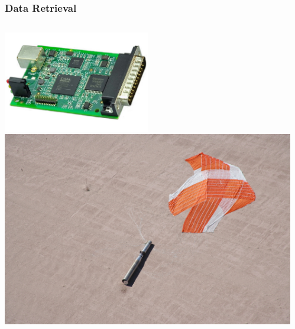 \documentclass[landscape,xcolor={table}]{beamer}
\begin{document}
	\begin{frame}
		
		\frametitle{Data Retrieval}
		
		\begin{columns}[T] %
		\begin{column}{.49\textwidth}

			\includegraphics[width=0.5\textwidth]{images/synclink} \\
			\includegraphics[width=\textwidth]{images/desert}
			
		\end{column}%
		\hfill%
		\begin{column}{.49\textwidth}


					
		\end{column}%
		\end{columns}

	\end{frame}
	
\end{document}
